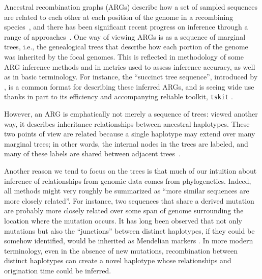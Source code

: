 \documentclass[10pt,twoside,lineno]{gsajnl}
\newcommand{\tskit}{\texttt{tskit}}
\begin{document}
Ancestral recombination graphs (ARGs) describe how a set of sampled sequences 
are related to each other at each position of the genome in a recombining
species~\citep{brandt2024promise,lewanski2024introduction,nielsen2024inference,
wong2024general}, and there has been significant recent progress 
on inference through a range of approaches~\citep{rasmussen2014genome,
speidel2019method,kelleher2019inferring,zhang2023biobankscale,deng2024robust}.
One way of viewing ARGs is as a sequence of marginal trees,
i.e., the genealogical trees that describe how each portion of the genome
was inherited by the focal genomes.
This is reflected in methodology of some ARG inference methods
and in metrics used to assess inference accuracy,
as well as in basic terminology.
For instance, 
the ``succinct tree sequence'',
introduced by \citet{kelleher2016efficient},
is a common format for describing these inferred ARGs,
and is seeing wide use thanks in part to its efficiency and accompanying reliable toolkit,
\tskit{} \citep{tskit,ralph2020efficiently}.

However, an ARG is emphatically not merely a sequence of trees:
viewed another way, it describes inheritance relationships between ancestral haplotypes.
These two points of view are related because a single haplotype
may extend over many marginal trees;
in other words, the internal nodes in the trees are labeled, and many of these labels
are shared between adjacent trees~\citep{wong2024general}.

Another reason we tend to focus on the trees is that
much of our intuition about inference of relationships from genomic data
comes from phylogenetics.
Indeed, all methods might very roughly be summarized as
``more similar sequences are more closely related''.
For instance, two sequences that share a derived mutation
are probably more closely related over some span of genome surrounding the location where the mutation occurs.
It has long been observed 
that not only mutations
but also the ``junctions'' between distinct haplotypes,
if they could be somehow identified,
would be inherited as Mendelian markers
\citep{fisher1954fuller,chapman2003model}.
In more modern terminology, 
even in the absence of new mutations,
recombination between distinct haplotypes can create a novel haplotype
whose relationships and origination time could be inferred.
\end{document}
